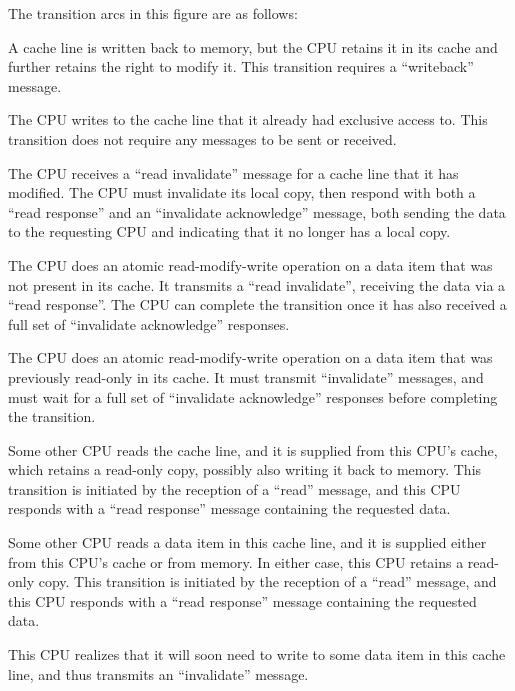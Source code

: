The transition arcs in this figure are as follows:
\begin{description}[style=nextline]
\item	[Transition (a):]
	A cache line is written back to memory, but the CPU retains
	it in its cache and further retains the right to modify it.
	This transition requires a ``writeback'' message.
\item	[Transition (b):]
	The CPU writes to the cache line that it already had exclusive
	access to.
	This transition does not require any messages to be sent or
	received.
\item	[Transition (c):]
	The CPU receives a ``read invalidate'' message for a cache line
	that it has modified.
	The CPU must invalidate its local copy, then respond with both a
	``read response'' and an ``invalidate acknowledge'' message,
	both sending the data to the requesting CPU and indicating
	that it no longer has a local copy.
\item	[Transition (d):]
	The CPU does an atomic read-modify-write operation on a data item
	that was not present in its cache.
	It transmits a ``read invalidate'', receiving the data via
	a ``read response''.
	The CPU can complete the transition once it has also received a
	full set of ``invalidate acknowledge'' responses.
\item	[Transition (e):]
	The CPU does an atomic read-modify-write operation on a data item
	that was previously read-only in its cache.
	It must transmit ``invalidate'' messages, and must wait for a
	full set of ``invalidate acknowledge'' responses before completing
	the transition.
\item	[Transition (f):]
	Some other CPU reads the cache line, and it is supplied from
	this CPU's cache, which retains a read-only copy, possibly also
	writing it back to memory.
	This transition is initiated by the reception of a ``read''
	message, and this CPU responds with a ``read response'' message
	containing the requested data.
\item	[Transition (g):]
	Some other CPU reads a data item in this cache line,
	and it is supplied either from this CPU's cache or from memory.
	In either case, this CPU retains a read-only copy.
	This transition is initiated by the reception of a ``read''
	message, and this CPU responds with a ``read response'' message
	containing the requested data.
\item	[Transition (h):]
	This CPU realizes that it will soon need to write to some data
	item in this cache line, and thus transmits an ``invalidate'' message.

\end{description}

